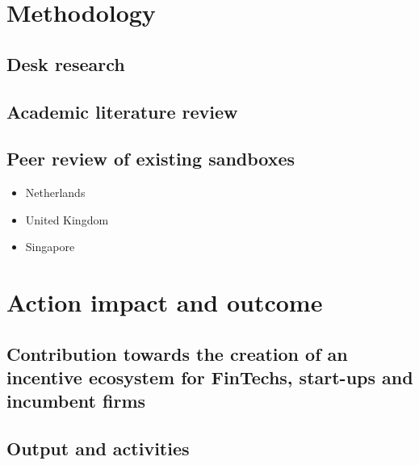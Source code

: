 \documentclass[
]{book}
\begin{document}
\hypertarget{methodology}{%
\chapter{Methodology}\label{methodology}}

\hypertarget{desk-research}{%
\section{Desk research}\label{desk-research}}

\hypertarget{academic-literature-review}{%
\section{Academic literature review}\label{academic-literature-review}}

\hypertarget{peer-review-of-existing-sandboxes}{%
\section{Peer review of existing sandboxes}\label{peer-review-of-existing-sandboxes}}

\begin{itemize}
\item
  Netherlands
\item
  United Kingdom
\item
  Singapore
\end{itemize}

\hypertarget{action-impact-and-outcome}{%
\chapter{Action impact and outcome}\label{action-impact-and-outcome}}

\hypertarget{contribution-towards-the-creation-of-an-incentive-ecosystem-for-fintechs-start-ups-and-incumbent-firms}{%
\section{Contribution towards the creation of an incentive ecosystem for FinTechs, start-ups and incumbent firms}\label{contribution-towards-the-creation-of-an-incentive-ecosystem-for-fintechs-start-ups-and-incumbent-firms}}

\hypertarget{output-and-activities}{%
\section{Output and activities}\label{output-and-activities}}
\end{document}
